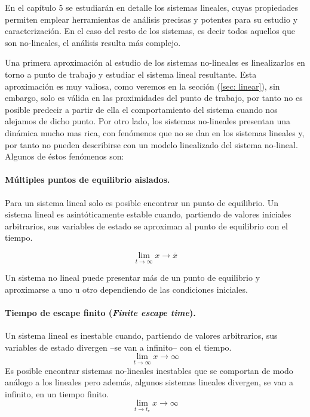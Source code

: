 En el capítulo 5 se estudiarán en detalle los sistemas lineales, cuyas propiedades permiten emplear herramientas de análisis precisas y potentes para su estudio y caracterización. En el caso del resto de los sistemas, es decir todos aquellos que son no-lineales, el análisis resulta más complejo.

Una primera aproximación al estudio de los sistemas no-lineales es linealizarlos en torno a punto de trabajo y estudiar el sistema lineal resultante. Esta aproximación es muy valiosa, como  veremos en la sección (\ref{sec: linear}), sin embargo, solo es válida en las proximidades del punto de trabajo, por tanto no es posible predecir a partir de ella el comportamiento del sistema cuando nos alejamos de dicho punto. Por otro lado, los sistemas no-lineales presentan una dinámica mucho mas rica, con fenómenos que no se dan en los sistemas lineales y, por tanto no pueden describirse con un modelo linealizado del sistema no-lineal. Algunos de éstos fenómenos son:

\paragraph{Múltiples puntos de equilibrio aislados.} Para un sistema lineal solo es posible encontrar un punto de equilibrio.  Un sistema lineal es asintóticamente estable cuando, partiendo de valores iniciales arbitrarios, sus variables de estado se aproximan al punto de equilibrio con el tiempo. 

\begin{equation}
\lim_{ t \to \infty} x \to \overline x
\end{equation}


Un sistema no lineal puede presentar más de un punto de equilibrio y aproximarse a uno u otro dependiendo de las condiciones iniciales.

\paragraph{Tiempo de escape finito (\emph{Finite escape time}).} Un sistema lineal es inestable cuando, partiendo de valores arbitrarios, sus variables de estado divergen --se van a infinito-- con el tiempo.
\begin{equation}
\lim_{ t \to \infty} x \to \infty
\end{equation}
Es posible encontrar sistemas no-lineales inestables que se comportan de modo análogo a los lineales pero además, algunos sistemas lineales divergen, se van a infinito, en un tiempo finito. 
\begin{equation}
\lim_{ t \to t_e} x \to \infty
\end{equation}

